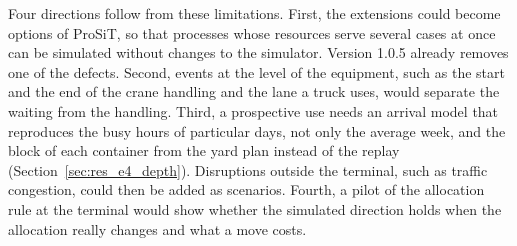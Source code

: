Four directions follow from these limitations. First, the extensions could become
options of ProSiT, so that processes whose resources serve several cases at once can be
simulated without changes to the simulator. Version 1.0.5 already removes one of the
defects. Second, events at the level of the equipment, such as the start and the end of
the crane handling and the lane a truck uses, would separate the waiting from the
handling. Third, a prospective use needs an arrival model that reproduces the busy
hours of particular days, not only the average week, and the block of each container
from the yard plan instead of the replay (Section~\ref{sec:res_e4_depth}). 
Disruptions outside the terminal, such as traffic congestion, could then be added as
scenarios. Fourth, a pilot of the allocation rule at the terminal would show whether
the simulated direction holds when the allocation really changes and what a move
costs.
